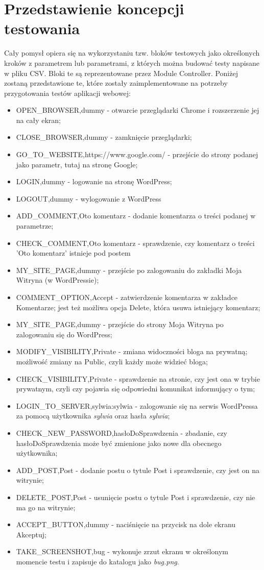 \section{Przedstawienie koncepcji testowania}

Cały pomysł opiera się na wykorzystaniu tzw. bloków testowych jako określonych kroków z parametrem lub parametrami, z których można budować testy napisane w pliku CSV. Bloki te są reprezentowane przez Module Controller. Poniżej zostaną przedstawione te, które zostały zaimplementowane na potrzeby przygotowania testów aplikacji webowej:

\begin{itemize}
\item OPEN\_BROWSER,dummy - otwarcie przeglądarki Chrome i rozszerzenie jej na cały ekran;
\item CLOSE\_BROWSER,dummy - zamknięcie przeglądarki;
\item GO\_TO\_WEBSITE,https://www.google.com/ - przejście do strony podanej jako parametr, tutaj na stronę Google;
\item LOGIN,dummy - logowanie na stronę WordPress;
\item LOGOUT,dummy - wylogowanie z WordPress
\item ADD\_COMMENT,Oto komentarz - dodanie komentarza o treści podanej w parametrze;
\item CHECK\_COMMENT,Oto komentarz - sprawdzenie, czy komentarz o treści 'Oto komentarz' istnieje pod postem
\item MY\_SITE\_PAGE,dummy - przejście po zalogowaniu do zakładki Moja Witryna (w WordPressie); 
\item COMMENT\_OPTION,Accept - zatwierdzenie komentarza w zakładce Komentarze; jest też możliwa opcja Delete, która usuwa istniejący komentarz;
\item MY\_SITE\_PAGE,dummy - przejście do strony Moja Witryna po zalogowaniu się do WordPress;
\item MODIFY\_VISIBILITY,Private - zmiana widoczności bloga na prywatną; możliwość zmiany na Public, czyli każdy może widzieć bloga;
\item CHECK\_VISIBILITY,Private - sprawdzenie na stronie, czy jest ona w trybie prywatnym, czyli czy pojawia się odpowiedni komunikat informujący o tym; 
\item LOGIN\_TO\_SERVER,sylwia:sylwia - zalogowanie się na serwis WordPressa za pomocą użytkownika \textit{sylwia} oraz hasła \textit{sylwia};
\item CHECK\_NEW\_PASSWORD,hasłoDoSprawdzenia - zbadanie, czy hasłoDoSprawdzenia może być zmienione jako nowe dla obecnego użytkownika;
\item ADD\_POST,Post - dodanie postu o tytule Post i sprawdzenie, czy jest on na witrynie;
\item DELETE\_POST,Post - usunięcie postu o tytule Post i sprawdzenie, czy nie ma go na witrynie;
\item ACCEPT\_BUTTON,dummy - naciśnięcie na przycisk na dole ekranu Akceptuj;
\item TAKE\_SCREENSHOT,bug - wykonuje zrzut ekranu w określonym momencie testu i zapisuje do katalogu jako \textit{bug.png}.
\end{itemize}

